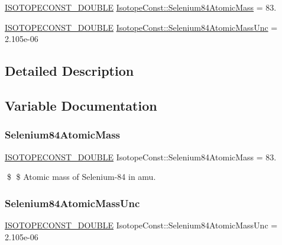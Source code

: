 \begin{DoxyCompactItemize}
\item 
\mbox{\hyperlink{group___isotope_const-_macros_ga8f45a7272ce02c0b4c65c44636ed719a}{I\+S\+O\+T\+O\+P\+E\+C\+O\+N\+S\+T\+\_\+\+D\+O\+U\+B\+LE}} \mbox{\hyperlink{group___isotope_const-_selenium-_se84_gad58dd7fe523908a01ae5d4b5a532ee62}{Isotope\+Const\+::\+Selenium84\+Atomic\+Mass}} = 83.
\item 
\mbox{\hyperlink{group___isotope_const-_macros_ga8f45a7272ce02c0b4c65c44636ed719a}{I\+S\+O\+T\+O\+P\+E\+C\+O\+N\+S\+T\+\_\+\+D\+O\+U\+B\+LE}} \mbox{\hyperlink{group___isotope_const-_selenium-_se84_ga0c14c445221b74221a60aaf083fff653}{Isotope\+Const\+::\+Selenium84\+Atomic\+Mass\+Unc}} = 2.\+105e-\/06
\end{DoxyCompactItemize}


\subsection{Detailed Description}


\subsection{Variable Documentation}
\mbox{\label{group___isotope_const-_selenium-_se84_gad58dd7fe523908a01ae5d4b5a532ee62}} 
\subsubsection{\texorpdfstring{Selenium84\+Atomic\+Mass}{Selenium84AtomicMass}}
{\footnotesize\ttfamily \mbox{\hyperlink{group___isotope_const-_macros_ga8f45a7272ce02c0b4c65c44636ed719a}{I\+S\+O\+T\+O\+P\+E\+C\+O\+N\+S\+T\+\_\+\+D\+O\+U\+B\+LE}} Isotope\+Const\+::\+Selenium84\+Atomic\+Mass = 83.}

\$ \$ Atomic mass of Selenium-\/84 in amu. \mbox{\label{group___isotope_const-_selenium-_se84_ga0c14c445221b74221a60aaf083fff653}} 
\subsubsection{\texorpdfstring{Selenium84\+Atomic\+Mass\+Unc}{Selenium84AtomicMassUnc}}
{\footnotesize\ttfamily \mbox{\hyperlink{group___isotope_const-_macros_ga8f45a7272ce02c0b4c65c44636ed719a}{I\+S\+O\+T\+O\+P\+E\+C\+O\+N\+S\+T\+\_\+\+D\+O\+U\+B\+LE}} Isotope\+Const\+::\+Selenium84\+Atomic\+Mass\+Unc = 2.\+105e-\/06}

